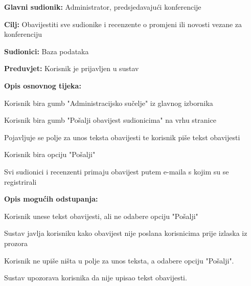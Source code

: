 				
					\noindent {}
					\begin{packed_item}
						\item \textbf{Glavni sudionik:} Administrator, predsjedavajući konferencije
						\item \textbf{Cilj:} Obavijestiti sve sudionike i recenzente o promjeni ili novosti vezane za konferenciju
						\item \textbf{Sudionici:} Baza podataka
						\item \textbf{Preduvjet:} Korisnik je prijavljen u sustav
						
						\item \textbf{Opis osnovnog tijeka:} 
						\item[] \begin{packed_enum}
							\item Korisnik bira gumb "Administracijsko sučelje" iz glavnog izbornika
							\item Korisnik bira gumb "Pošalji obavijest sudionicima" na vrhu stranice
							\item Pojavljuje se polje za unos teksta obavijesti te korisnik piše tekst obavijesti
							\item Korisnik bira opciju "Pošalji"
							\item Svi sudionici i recenzenti primaju obavijest putem e-maila s kojim su se registrirali
						\end{packed_enum}
					
						\item \textbf{Opis mogućih odstupanja:}
						\item[] \begin{packed_enum}
							
		

							\item[5.a] Korisnik unese tekst obavijesti, ali ne odabere opciju "Pošalji"
							\item[] \begin{packed_enum}
								\item[1.] Sustav javlja korisniku kako obavijest nije poslana korisnicima prije izlaska iz prozora
							\end{packed_enum}
							\item[5.b] Korisnik ne upiše ništa u polje za unos teksta, a odabere opciju "Pošalji".
							\item[] \begin{packed_enum}
								\item[1.] Sustav upozorava korisnika da nije upisao tekst obavijesti.
							\end{packed_enum}
							
						\end{packed_enum}
					\end{packed_item}


